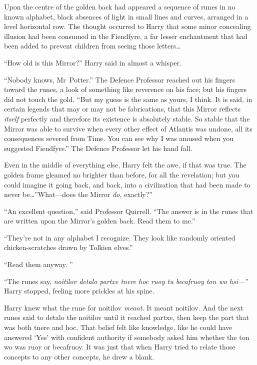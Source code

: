 Upon the centre of the golden back had appeared a sequence of runes in no known
alphabet, black absences of light in small lines and curves, arranged in a
level horizontal row. The thought occurred to Harry that some minor concealing
illusion had been consumed in the Fiendfyre, a far lesser enchantment that had
been added to prevent children from seeing those letters…

“How old is this Mirror?” Harry said in almost a whisper.

“Nobody knows, Mr~Potter.” The Defence Professor reached out his fingers
toward the runes, a look of something like reverence on his face; but his
fingers did not touch the gold. “But my guess is the same as yours, I think. It
is said, in certain legends that may or may not be fabrications, that this
Mirror reflects \emph{itself} perfectly and therefore its existence is
absolutely stable. So stable that the Mirror was able to survive when every
other effect of Atlantis was undone, all its consequences severed from Time.
You can see why I was amused when you suggested Fiendfyre.” The Defence
Professor let his hand fall.

Even in the middle of everything else, Harry felt the awe, if that was true.
The golden frame gleamed no brighter than before, for all the revelation; but
you could imagine it going back, and back, into a civilization that had been
made to never be…”What—does the Mirror \emph{do,} exactly?”

“An excellent question,” said Professor Quirrell. “The answer is in the runes
that are written upon the Mirror’s golden back. Read them to me.”

“They’re not in any alphabet I recognize. They look like randomly oriented
chicken-scratches drawn by Tolkien elves.”

“Read them anyway. ”

“The runes say, \emph{noitilov detalo partxe tnere hoc ruoy tu becafruoy ton wo
hsi—}” Harry stopped, feeling more prickles at his spine.

Harry knew what the rune for noitilov \emph{meant}. It meant noitilov. And the
next runes said to detalo the noitilov until it reached partxe, then keep the
part that was both tnere and hoc. That belief felt like knowledge, like he could
have answered ‘Yes’ with confident authority if somebody asked him
whether the ton wo was ruoy or becafruoy. It was just that when Harry tried to
relate those concepts to any other concepts, he drew a blank.

